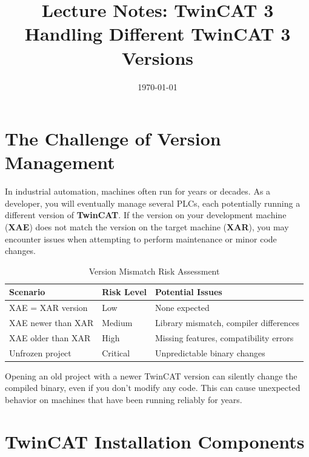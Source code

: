\documentclass[11pt,a4paper]{article}
\title{
    \vspace{-1cm}
    \textbf{Lecture Notes: TwinCAT 3}\\
    \Large Handling Different TwinCAT 3 Versions
}
\author{}
\date{\today}
\begin{document}
\maketitle

\tableofcontents
\newpage

\section{The Challenge of Version Management}

In industrial automation, machines often run for years or decades. As a developer, you will eventually manage several PLCs, each potentially running a different version of \textbf{TwinCAT}. If the version on your development machine (\textbf{XAE}) does not match the version on the target machine (\textbf{XAR}), you may encounter issues when attempting to perform maintenance or minor code changes.

\begin{table}[h]
\centering
\begin{tabular}{@{}lll@{}}
\toprule
\textbf{Scenario} & \textbf{Risk Level} & \textbf{Potential Issues} \\
\midrule
XAE = XAR version & Low & None expected \\
XAE newer than XAR & Medium & Library mismatch, compiler differences \\
XAE older than XAR & High & Missing features, compatibility errors \\
Unfrozen project & Critical & Unpredictable binary changes \\
\bottomrule
\end{tabular}
\caption{Version Mismatch Risk Assessment}
\end{table}

\begin{warningbox}
Opening an old project with a newer TwinCAT version can silently change the compiled binary, even if you don't modify any code. This can cause unexpected behavior on machines that have been running reliably for years.
\end{warningbox}

\section{TwinCAT Installation Components}
\end{document}
